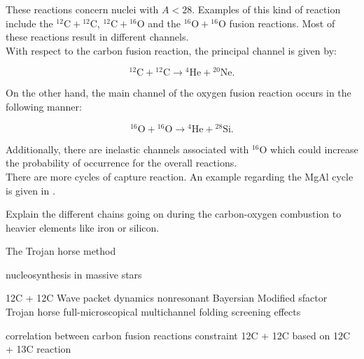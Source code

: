 \documentclass[openany]{book}
\begin{document}
These reactions concern nuclei with $A < 28$. Examples of this kind of reaction include the $\mathrm{{}^{12}C + {}^{12}C}$,  $\mathrm{{}^{12}C + {}^{16}O}$ and the  $\mathrm{{}^{16}O + {}^{16}O}$ fusion reactions. Most of these reactions result in different channels. \\ 

With respect to the carbon fusion reaction, the principal channel is given by: 

\begin{equation}
	\mathrm{{}^{12}C + {}^{12}C \rightarrow {}^{4}He + {}^{20}Ne}. 
\end{equation}

On the other hand, the main channel of the oxygen fusion reaction occurs in the following manner:

\begin{equation}
	\mathrm{{}^{16}O + {}^{16}O \rightarrow {}^{4}He + {}^{28}Si}. 
\end{equation}

Additionally, there are inelastic channels associated with $\mathrm{{}^{16}O}$ which could increase the probability of occurrence for the overall reactions.  \\



There are more cycles of capture reaction. An example regarding the MgAl cycle is given in \cite{lotay_doherty_janssens_seweryniak_albers_almaraz-calderon_carpenter_champagne_chiara_hoffman_et_2022}.

Explain the different chains going on during the carbon-oxygen combustion to heavier elements like iron or silicon.

The Trojan horse method\cite{spitaleri_mukhamedzhanov_blokhintsev_cognata_pizzone_tumino_2011}

nucleosynthesis in massive stars \cite{pignatari_hirschi_wiescher_gallino_bennett_beard_fryer_herwig_rockefeller_timmes_et_2012}

12C + 12C Wave packet dynamics\cite{diaz-torres_wiescher_2018}
nonresonant Bayersian \cite{li_fang_bucher_li_ru_tang_2020}
Modified sfactor \cite{luo_wen_lin_yang_jia_yang_huang_chang_zhang_yang_et_2022}
Trojan horse \cite{mukhamedzhanov_pang_kadyrov_2019}
\cite{mukhamedzanov_2022}
full-microscopical \cite{taniguchi_kimura_2021}
multichannel folding \cite{assuncao_descouvemont_2016}
screening effects \cite{koyuncu_soylu_2018}

correlation between carbon fusion reactions \cite{notani_esbensen_fang_bucher_davies_jiang_lamm_lin_ma_martin_et_2012}
constraint 12C + 12C based on 12C + 13C reaction \cite{zhang_wang_tudor_bucher_burducea_chen_chen_chesneanu_chilug_gasques_et_2020}
\end{document}
